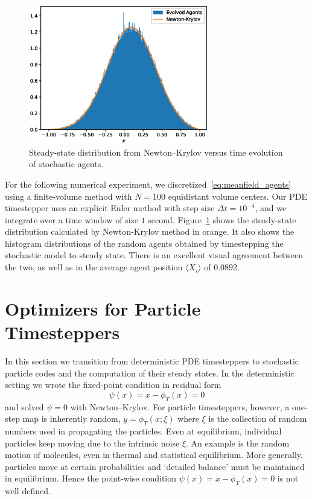 \documentclass{article}
\begin{document}
\begin{figure}[!ht]
    \centering
    \includegraphics[width=0.7\textwidth]{figures/PDE_agents_ss.eps}
    \caption{Steady-state distribution from Newton--Krylov versus time evolution of stochastic agents.}
    \label{fig:agent_pde_ss}
\end{figure}

For the following numerical experiment, we discretized~\eqref{eq:meanfield_agents} using a finite-volume method with $N=100$ equidistant volume centers. Our PDE timestepper uses an explicit Euler method with step size $\Delta t = 10^{-4}$, and we integrate over a time window of size $1$ second. Figure~\ref{fig:agent_pde_ss} shows the steady-state distribution calculated by Newton-Krylov method in orange. It also shows the histogram distributions of the random agents obtained by timestepping the stochastic model to steady state. There is an excellent visual agreement between the two, as well as in the average agent position $\langle X_i \rangle$ of $0.0892$.

\section{Optimizers for Particle Timesteppers} \label{sec:w2_stochastics}
In this section we transition from deterministic PDE timesteppers to stochastic particle codes and the computation of their steady states. In the deterministic setting we wrote the fixed-point condition in residual form
\begin{equation}
\psi(x) = x-\phi_T(x) = 0
\end{equation}
and solved $\psi=0$ with Newton–Krylov. For particle timesteppers, however, a one-step map is inherently random, $y=\phi_T(x;\xi)$ where $\xi$ is the collection of random numbers used in propagating the particles. Even at equilibrium, individual particles keep moving due to the intrinsic noise $\xi$. An example is the random motion of molecules, even in thermal and statistical equilibrium. More generally, particles move at certain probabilities and `detailed balance' must be maintained in equilibrium. Hence the point-wise condition $\psi(x)=x-\phi_T(x)=0$ is not well defined. 
\end{document}
